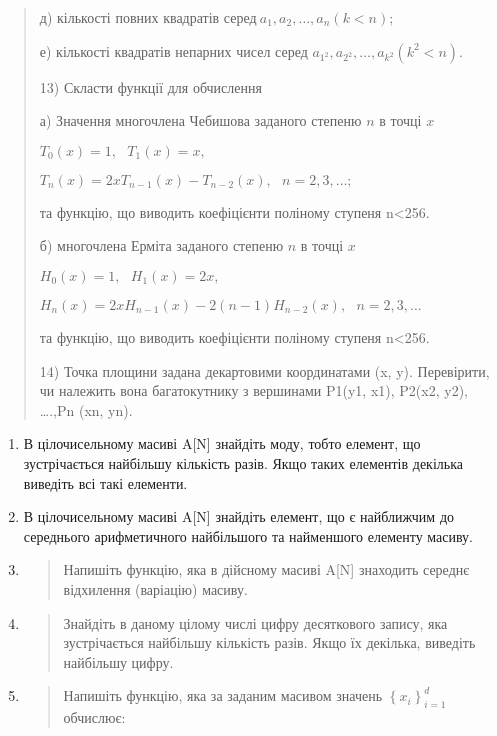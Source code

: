 \documentclass[]{article}
\begin{document}
\begin{quote}
д) кількості повних квадратів
серед\(\ a_{1},a_{2},\ldots,a_{n}(k < n)\);

е) кількості квадратів непарних чисел серед
\(a_{1^{2}},a_{2^{2}},\ldots,a_{k^{2}}(k^{2} < n).\)

13) Скласти функції для обчислення

а) Значення многочлена Чебишова заданого степеню \(n\) в точці \(x\)

\(T_{0}(x) = 1,\mathrm{\text{\ \ }}T_{1}(x) = x,\)

\(T_{n}(x) = 2xT_{n - 1}(x) - T_{n - 2}(x),\mathrm{\text{\ \ }}n = 2,3,\ldots;\)

та функцію, що виводить коефіцієнти поліному ступеня n\textless{}256.

б) многочлена Ерміта заданого степеню \(n\) в точці \(x\)

\(H_{0}(x) = 1,\mathrm{\text{\ \ }}H_{1}(x) = 2x,\)

\(H_{n}(x) = 2xH_{n - 1}(x) - 2(n - 1)H_{n - 2}(x),\mathrm{\text{\ \ \ \ \ \ }}n = 2,3,\ldots\)

та функцію, що виводить коефіцієнти поліному ступеня n\textless{}256.

14) Точка площини задана декартовими координатами (x, y). Перевірити, чи
належить вона багатокутнику з вершинами P1(y1, x1), P2(x2, y2),
\ldots{}.,Pn (xn, yn).
\end{quote}

\begin{enumerate}
\def\labelenumi{\arabic{enumi})}
\setcounter{enumi}{16}
\item
  В цілочисельному масиві A{[}N{]} знайдіть моду, тобто елемент, що
  зустрічається найбільшу кількість разів. Якщо таких елементів декілька
  виведіть всі такі елементи.
\item
  В цілочисельному масиві A{[}N{]} знайдіть елемент, що є найближчим до
  середнього арифметичного найбільшого та найменшого елементу масиву.
\item
  \begin{quote}
  Напишіть функцію, яка в дійсному масиві A{[}N{]} знаходить середнє
  відхилення (варіацію) масиву.
  \end{quote}
\item
  \begin{quote}
  Знайдіть в даному цілому числі цифру десяткового запису, яка
  зустрічається найбільшу кількість разів. Якщо їх декілька, виведіть
  найбільшу цифру.
  \end{quote}
\item
  \begin{quote}
  Напишіть функцію, яка за заданим масивом значень
  \(\left\{ x_{i} \right\}_{i = 1}^{d}\) обчислює:
  \end{quote}
\end{enumerate}
\end{document}
